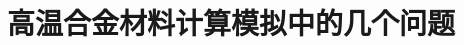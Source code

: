 
\title{高温合金材料计算模拟中的几个问题}
\author[ ]{}   %
\renewcommand*{\Authfont}{\small\rm} %
\renewcommand*{\Affilfont}{\small\it} %
\renewcommand\Authands{ and } %
\renewcommand\Authands{ , } %
\date{} %


\maketitle
